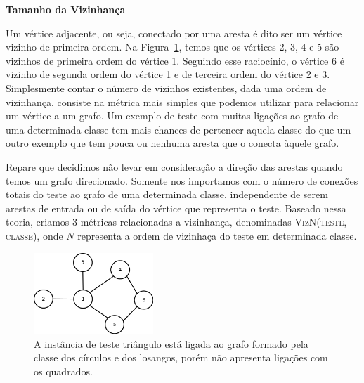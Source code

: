 


\begin{description}

\item{\textbf{Tamanho da Vizinhança}}
\label{item::neighborhoodsize}

Um vértice adjacente, ou seja, conectado por uma aresta é dito ser um vértice vizinho de primeira ordem. Na Figura~\ref{fig::vizinhos}, temos que os vértices 2, 3, 4 e 5 são vizinhos de primeira ordem do vértice 1. Seguindo esse raciocínio, o vértice 6 é vizinho de segunda ordem do vértice 1 e de terceira ordem do vértice 2 e 3. 
Simplesmente contar o número de vizinhos existentes, dada uma ordem de vizinhança, consiste na métrica mais simples que podemos utilizar para relacionar um vértice a um grafo. Um exemplo de teste com muitas ligações ao grafo de uma determinada classe tem mais chances de pertencer aquela classe do que um outro exemplo que tem pouca ou nenhuma aresta que o conecta àquele grafo. 

Repare que decidimos não levar em consideração a direção das arestas quando temos um grafo direcionado. Somente nos importamos com o número de conexões totais do teste ao grafo de uma determinada classe, independente de serem arestas de entrada ou de saída do vértice que representa o teste. Baseado nessa teoria, criamos 3 métricas relacionadas a vizinhança, denominadas \textsc{VizN(teste, classe)}, onde $N$ representa a ordem de vizinhaça do teste em determinada classe.


\begin{figure}[ht!]
\centering
\includegraphics[width=0.4\textwidth]{figures/vizinhos.png}
\caption{A instância de teste triângulo está ligada ao grafo formado pela classe dos círculos e dos losangos, porém não apresenta ligações com os quadrados.}
\label{fig::vizinhos}
\end{figure}


\end{description}
